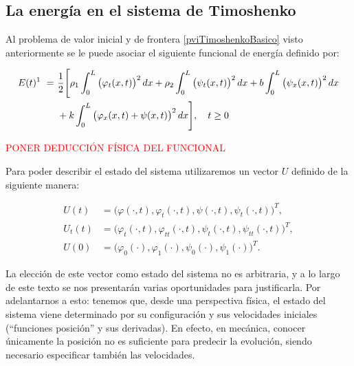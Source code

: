 \subsection{La energía en el sistema de Timoshenko}
\label{ch:timoshenko:section:primerosmodelos:subsection:timoshenkoEnergia}

Al problema de valor inicial y de frontera \eqref{pviTimoshenkoBasico} visto anteriormente se le puede asociar el siguiente funcional de energía definido por:

\begin{equation}
    \label{timoshenkoBasico:funcionalEnergia}
    \begin{aligned}
        E(t)\text{\footnotemark} \ = \  &\frac{1}{2} \Bigg[ \rho_1 \int_0^L \big(\varphi_t(x,t) \big)^2 \, dx + \rho_2 \int_0^L \big(\psi_t(x,t) \big)^2 \, dx + b\int_0^L \big(\psi_x(x,t) \big)^2 \, dx\\
        &+ k\int_0^L \big(\varphi_x(x,t) + \psi(x,t) \big)^2 \, dx \Bigg], \quad t \geq 0
    \end{aligned}
\end{equation}


\textcolor{red}{PONER DEDUCCIÓN FÍSICA DEL FUNCIONAL}

Para poder describir el estado del sistema utilizaremos un vector $U$ definido de la siguiente manera:

\begin{align*}
    U(t) &= \Big(\varphi(\cdot, t), \varphi_t(\cdot, t), \psi(\cdot, t), \psi_t(\cdot, t)\Big)^T,\\
    U_t(t) &= \Big(\varphi_t(\cdot, t), \varphi_{tt}(\cdot, t), \psi_t(\cdot, t), \psi_{tt}(\cdot, t)\Big)^T,\\
    U(0) &= \Big(\varphi_0(\cdot), \varphi_1(\cdot), \psi_0(\cdot), \psi_1(\cdot)\Big)^T.
\end{align*}

La elección de este vector como estado del sistema no es arbitraria, y a lo largo de este texto se nos presentarán varias oportunidades para justificarla. Por adelantarnos a esto: tenemos que, desde una perspectiva física, el estado del sistema viene determinado por su configuración y sus velocidades iniciales (``funciones posición'' y sus derivadas). En efecto, en mecánica, conocer únicamente la posición no es suficiente para predecir la evolución, siendo necesario especificar también las velocidades.

